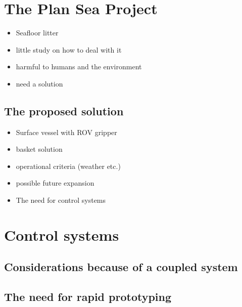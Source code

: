 

\section{The Plan Sea Project}
\begin{itemize}
\item Seafloor litter
\item little study on how to deal with it
\item harmful to humans and the environment
\item need a solution
\end{itemize}

\subsection{The proposed solution}
\begin{itemize}
\item Surface vessel with ROV gripper
\item basket solution
\item operational criteria (weather etc.)
\item possible future expansion
\item The need for control systems
\end{itemize}

\section{Control systems}
\subsection{Considerations because of a coupled system}
\subsection{The need for rapid prototyping}
